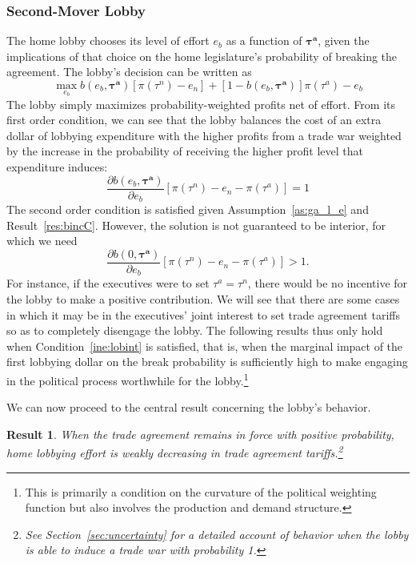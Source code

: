 \documentclass[10pt]{article}
\newtheorem{result}{Result}
\newcommand{\bta}{\bm{\tau^a}}
\begin{document}
\subsubsection{Second-Mover Lobby}
\label{sec:lob_un}
The home lobby chooses its level of effort $e_b$ as a function of $\bta$, given the implications of that choice on the home legislature's probability of breaking the agreement. The lobby's decision can be written as
\[
  \max_{e_b} b(e_b,\bta) \left[\pi(\tau^n) - e_n \right] + [1 - b(e_b,\bta)] \pi(\tau^a) - e_b
\]
The lobby simply maximizes probability-weighted profits net of effort. From its first order condition, we can see that the lobby balances the cost of an extra dollar of lobbying expenditure with the higher profits from a trade war weighted by the increase in the probability of receiving the higher profit level that expenditure induces:
\begin{equation}
	\frac{\partial b(e_b,\bta)}{\partial e_b} \left[ \pi(\tau^n) -e_n - \pi(\tau^a) \right] = 1 
	\label{eq:lobbyfoc}
\end{equation}
The second order condition is satisfied given Assumption~\ref{as:ga_l_e} and Result~\ref{res:bincC}. However, the solution is not guaranteed to be interior, for which we need
  \begin{equation}
	  \frac{\partial b(0,\bta)}{\partial e_b} \left[ \pi(\tau^n) -e_n- \pi(\tau^a) \right] > 1.
		\label{ine:lobint}	
  \end{equation}
For instance, if the executives were to set $\tau^a = \tau^n$, there would be no incentive for the lobby to make a positive contribution. We will see that there are some cases in which it may be in the executives' joint interest to set trade agreement tariffs so as to completely disengage the lobby. The following results thus only hold when Condition~\ref{ine:lobint} is satisfied, that is, when the marginal impact of the first lobbying dollar on the break probability is sufficiently high to make engaging in the political process worthwhile for the lobby.\footnote{This is primarily a condition on the curvature of the political weighting function but also involves the production and demand structure.}
  
We can now proceed to the central result concerning the lobby's behavior. 
\begin{result}
  When the trade agreement remains in force with positive probability, home lobbying effort is weakly decreasing in trade agreement tariffs.\footnote{See Section~\ref{sec:uncertainty} for a detailed account of behavior when the lobby is able to induce a trade war with probability 1.}
  \label{res:lobby}
\end{result}
\end{document}
